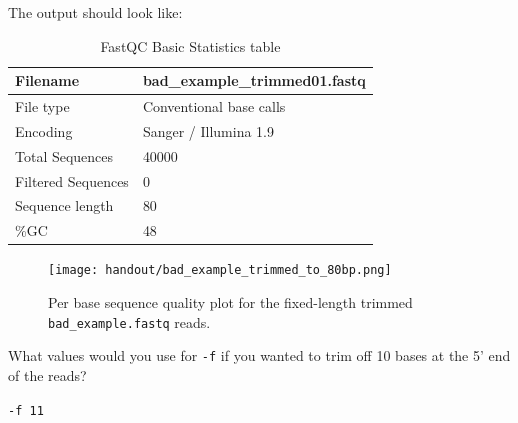 \begin{advanced}
\begin{steps}
The output should look like:

\begin{table}[H]
  \centering
  \caption{FastQC Basic Statistics table}
    \begin{tabular}{ll}
    \toprule
    Filename & bad\_example\_trimmed01.fastq\\
    \midrule
     File type & Conventional base calls\\
     Encoding & Sanger / Illumina 1.9\\
     Total Sequences & 40000\\
     Filtered Sequences & 0\\
     Sequence length & 80\\
    \%GC & 48\\
    \bottomrule
    \end{tabular}
  \label{tab:badexampletrimmed}
\end{table}

\begin{figure}[H]
\centering
\texttt{[image: handout/bad\_example\_trimmed\_to\_80bp.png]}
\caption{Per base sequence quality plot for the fixed-length trimmed \texttt{bad\_example.fastq} reads.}
\label{fig:bad_example_trimmed_plot}
\end{figure}

\end{steps}

\begin{questions}
What values would you use for \texttt{-f} if you wanted to trim off 10 bases at
the 5' end of the reads?
\begin{answer}
\texttt{-f 11}
\end{answer}
\end{questions}
\end {advanced}
